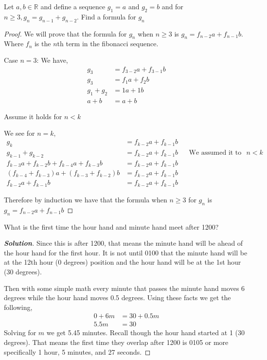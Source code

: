 \documentclass[11pt]{article}
\newenvironment{problem}[2][Problem\!]{\begin{trivlist}
\item[\hskip \labelsep {\bfseries #1}\hskip \labelsep {\bfseries #2}]}{\end{trivlist}}
\newenvironment{solution}{\begin{proof}[\textbf{\textit{Solution}}] }{\end{proof}}
\newcommand{\rr}{\mathbb R}   %
\renewcommand{\geq}{\geqslant}
\begin{document}
\begin{tcolorbox}
    \begin{problem}{IC 10/1 19.} Let $a,b \in \rr$ and define a sequence $g_1 = a$ and $g_2 = b$ and for $n \geq 3, g_n = g_{n-1} + g_{n-2}$. Find a formula for $g_n$ 
    \end{problem}
\end{tcolorbox}
\begin{proof}
    We will prove that the formula for $g_n$ when $n \geq 3$ is $g_{n} = f_{n-2}a + f_{n-1}b$. Where $f_n$ is the $n$th term in the fibonacci sequence.

    Case $n=3$: We have,
    \begin{align*}
         g_{3} &= f_{3-2}a + f_{3-1}b\\
         g_3 &= f_1a + f_2b \\
         g_1 + g_2 &=  1a + 1b \\
        a + b &= a + b
    \end{align*}
    
    Assume it holds for $n < k$

    We see for $n = k$,
    \begin{align*}
        g_k &= f_{k -2}a + f_{k -1}b \\
        g_{k-1} + g_{k-2} &= f_{k-2}a + f_{k-1}b  && \text{We assumed it to hold for $n < k$} \\
        f_{k -3}a + f_{k -2}b + f_{k-4}a + f_{k-3}b &= f_{k-2}a + f_{k-1}b \\
        (f_{k-4} + f_{k-3})a + (f_{k-3}+f_{k-2})b&=f_{k-2}a + f_{k-1}b \\
        f_{k-2}a + f_{k-1}b &= f_{k-2}a + f_{k-1}b
    \end{align*}

    Therefore by induction we have that the formula when $n\geq 3$ for $g_n$ is $g_n = f_{n-2}a + f_{n-1}b$
    
\end{proof}
\newpage
\begin{tcolorbox}
    \begin{problem} {OC 10/1 18}
        What is the first time the hour hand and minute hand meet after 1200?
    \end{problem}
\end{tcolorbox}

\begin{solution}
    Since this is after 1200, that means the minute hand will be ahead of the hour hand for the first hour. It is not until 0100 that the minute hand will be at the 12th hour (0 degrees) position and the hour hand will be at the 1st hour (30 degrees). 

    Then with some simple math every minute that passes the minute hand moves 6 degrees while the hour hand moves 0.5 degrees. Using these facts we get the following,
    \begin{align*}
        0 + 6m &= 30 + 0.5m \\
        5.5m &= 30
    \end{align*}
    Solving for $m$ we get 5.45 minutes. Recall though the hour hand started at 1 (30 degrees). That means the first time they overlap after 1200 is 0105 or more specifically 1 hour, 5 minutes, and 27 seconds. 
\end{solution}
\end{document}
